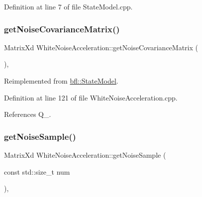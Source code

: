 Definition at line 7 of file State\+Model.\+cpp.

\mbox{\label{classbfl_1_1WhiteNoiseAcceleration_a453df5960973059b35ee8686dc12ab0d}} 
\subsubsection{\texorpdfstring{get\+Noise\+Covariance\+Matrix()}{getNoiseCovarianceMatrix()}}
{\footnotesize\ttfamily Matrix\+Xd White\+Noise\+Acceleration\+::get\+Noise\+Covariance\+Matrix (\begin{DoxyParamCaption}{ }\end{DoxyParamCaption})\hspace{0.3cm}{\ttfamily [override]}, {\ttfamily [virtual]}}



Reimplemented from \mbox{\hyperlink{classbfl_1_1StateModel_a423c1fa86b9d60c8663dedc6cdcae276}{bfl\+::\+State\+Model}}.



Definition at line 121 of file White\+Noise\+Acceleration.\+cpp.



References Q\+\_\+.

\mbox{\label{classbfl_1_1WhiteNoiseAcceleration_a819bd0d5510c9863272b422ab33b7adc}} 
\subsubsection{\texorpdfstring{get\+Noise\+Sample()}{getNoiseSample()}}
{\footnotesize\ttfamily Matrix\+Xd White\+Noise\+Acceleration\+::get\+Noise\+Sample (\begin{DoxyParamCaption}\item[{const std\+::size\+\_\+t}]{num }\end{DoxyParamCaption})\hspace{0.3cm}{\ttfamily [override]}, {\ttfamily [virtual]}}



